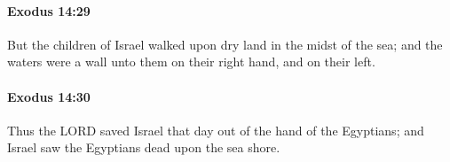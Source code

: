 		\paragraph{Exodus 14:29} %
			\label{EXODUS-14-29}

			But the children of Israel walked upon dry land in the midst of the sea; and the waters were a wall unto them on their right hand, and on their left.


		\paragraph{Exodus 14:30} %
			\label{EXODUS-14-30}

			Thus the LORD saved Israel that day out of the hand of the Egyptians; and Israel saw the Egyptians dead upon the sea shore.


